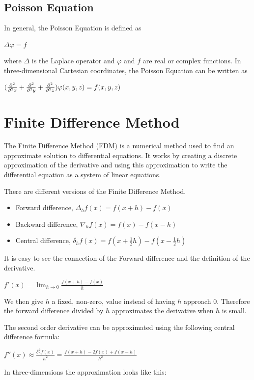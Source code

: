 \subsection*{Poisson Equation}

In general, the Poisson Equation is defined as 

$\Delta \varphi = f$

where $\Delta$ is the Laplace operator and $\varphi$ and $f$ are real or complex 
functions. In three-dimensional Cartesian coordinates, the Poisson Equation can 
be written as 

$(\frac{\partial^2}{\partial^2 x} + \frac{\partial^2}{\partial^2 y} + \frac{\partial^2}{\partial^2 z}) \varphi (x, y, z) = f(x, y, z)$


\section*{Finite Difference Method}

The Finite Difference Method (FDM) is a numerical method used to find an approximate 
solution to differential equations. It works by creating a discrete approximation 
of the derivative and using this approximation to write the differential equation 
as a system of linear equations.

There are different versions of the Finite Difference Method.
\begin{itemize}
	\item Forward difference, $\Delta_hf(x) = f(x+h) - f(x)$
	\item Backward difference, $\nabla_hf(x) = f(x) - f(x - h)$
	\item Central difference, $\delta_hf(x) = f(x + \frac{1}{2}h) - f(x - \frac{1}{2}h)$
\end{itemize}

It is easy to see the connection of the Forward difference and the definition of 
the derivative.

$f'(x) = \lim_{h \to 0} \frac{f(x+h) - f(x)}{h}$

We then give $h$ a fixed, non-zero, value instead of having $h$ approach 0. Therefore 
the forward difference divided by $h$ approximates the derivative when $h$ is small.

The second order derivative can be approximated using the following central difference formula:

$f''(x) \approx \frac{\delta_h^2f(x)}{h^2} = \frac{f(x+h) - 2f(x) + f(x-h)}{h^2}$

In three-dimensions the approximation looks like this:

